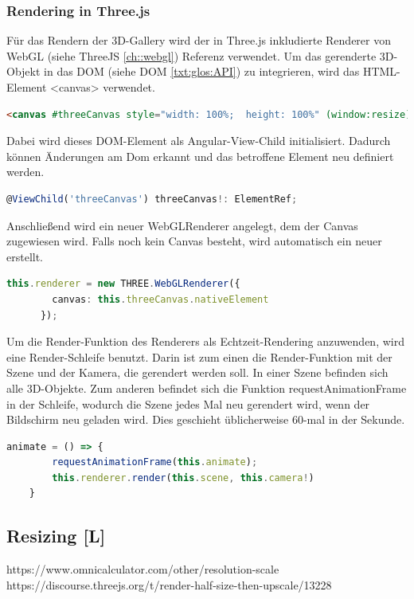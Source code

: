 \subsubsection{Rendering in Three.js}
Für das Rendern der 3D-Gallery wird der in Three.js inkludierte Renderer von WebGL (siehe ThreeJS \ref{ch::webgl}) Referenz verwendet. Um das gerenderte 3D-Objekt in das DOM (siehe DOM \ref{txt:glos:API}) zu integrieren, wird das HTML-Element <canvas> verwendet. \cite{ThreejsWebGLRenderer}

\begin{lstlisting}[caption={Canvas-Element in HTML},language=HTML,label=lst:impl:canvas]
    <canvas #threeCanvas style="width: 100%;  height: 100%" (window:resize)="onResize($event)"></canvas>
\end{lstlisting}
Dabei wird dieses DOM-Element als Angular-View-Child initialisiert. Dadurch können Änderungen am Dom erkannt und das betroffene Element neu definiert werden. \cite{AngularViewChild}
\begin{lstlisting}[caption={Canvas als View-Child initialisieren},language=TypeScript,label=lst:impl:viewchild]
    @ViewChild('threeCanvas') threeCanvas!: ElementRef;
\end{lstlisting}
Anschließend wird ein neuer WebGLRenderer angelegt, dem der Canvas zugewiesen wird. Falls noch kein Canvas besteht, wird automatisch ein neuer erstellt. \cite{ThreejsWebGLRenderer}
\begin{lstlisting}[caption={WebGlRenderer anlegen},language=TypeScript,label=lst:impl:WebGlRenderer]
    this.renderer = new THREE.WebGLRenderer({
        canvas: this.threeCanvas.nativeElement
      });
\end{lstlisting}
Um die Render-Funktion des Renderers als Echtzeit-Rendering anzuwenden, wird eine Render-Schleife benutzt. Darin ist zum einen die Render-Funktion mit der Szene und der Kamera, die gerendert werden soll. In einer Szene befinden sich alle 3D-Objekte. Zum anderen befindet sich die Funktion requestAnimationFrame in der Schleife, wodurch die Szene jedes Mal neu gerendert wird, wenn der Bildschirm neu geladen wird. Dies geschieht üblicherweise 60-mal in der Sekunde. \cite{ThreejsCreateAScene}
\begin{lstlisting}[caption={Animations-Schleife},language=TypeScript,label=lst:impl:animationloop]
    animate = () => {
        requestAnimationFrame(this.animate);
        this.renderer.render(this.scene, this.camera!)
    }  
\end{lstlisting}
\subsection{Resizing [L]} 
https://www.omnicalculator.com/other/resolution-scale
https://discourse.threejs.org/t/render-half-size-then-upscale/13228

